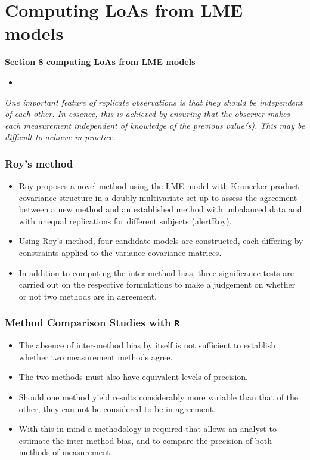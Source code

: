 \documentclass[compress]{beamer}        %
\begin{document}
\section{Computing LoAs from LME models}

\begin{frame}
\textbf{Section 8 computing LoAs from LME models}

\begin{itemize}
\item
\end{itemize}
\end{frame}

\begin{frame}
\emph{
One important feature of replicate observations is that they should be independent
of each other. In essence, this is achieved by ensuring that the observer makes each
measurement independent of knowledge of the previous value(s). This may be difficult
to achieve in practice.}
\end{frame}


\begin{frame}
\frametitle{Roy's method}
\begin{itemize}
\item Roy proposes a novel method using the LME model with Kronecker product covariance structure in a doubly multivariate set-up to assess the agreement between a new method and an established method with unbalanced data and with unequal replications for different subjects (alert{Roy}).
\item 
Using Roy's method, four candidate models are constructed, each differing by constraints applied to the variance covariance matrices.
\item In addition to computing the inter-method bias, three significance tests are carried out on the respective formulations to make a judgement on whether or not two methods are in agreement.
\end{itemize}
\end{frame}

\begin{frame}
\frametitle{Method Comparison Studies with \texttt{R}}
\large
\begin{itemize}
\item 
The absence of inter-method bias by itself is not sufficient to
establish whether two measurement methods agree. 
\item The two
methods must also have equivalent levels of precision. 
\item Should one
method yield results considerably more variable than that of the
other, they can not be considered to be in agreement. 
\item With this in
mind a methodology is required that allows an analyst to estimate
the inter-method bias, and to compare the precision of both
methods of measurement.
\end{itemize}
\end{frame}
\end{document}
